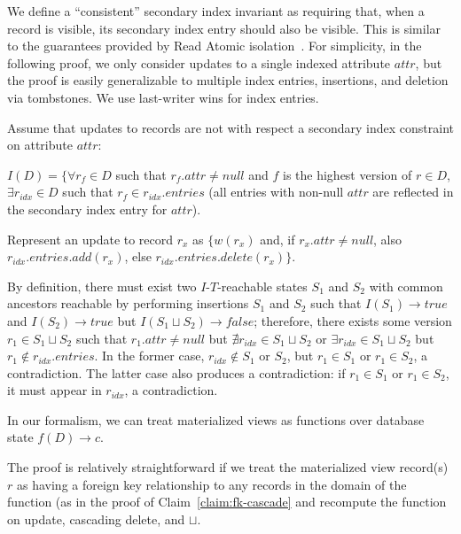 We define a ``consistent'' secondary index invariant as requiring that, when a record is visible, its secondary index entry should also be visible. This is similar to the guarantees provided by Read Atomic isolation~\cite{ramp-sigmod14}. For simplicity, in the following proof, we only consider updates to a single indexed attribute $attr$, but the proof is easily generalizable to multiple index entries, insertions, and deletion via tombstones. We use last-writer wins for index entries.

\begin{claim} \label{claim:indexing}
  Assume that updates to records are not \iconfluent with respect a secondary index constraint on attribute $attr$:

\noindent $I(D) = \{\forall r_f \in D$ such that $r_f.attr \neq null$ and $f$ is the highest version of $r\in D$, $\exists r_{idx} \in D$ such that $r_f \in r_{idx}.entries$ (all entries with non-null $attr$ are reflected in the secondary index entry for $attr$).

  Represent an update to record $r_x$ as $\{w(r_x)$ and, if $r_x.attr \neq null$, also $r_{idx}.entries.add(r_x)$, else $r_{idx}.entries.delete(r_x)\}$.

  By definition, there must exist two $I$-$T$-reachable states $S_1$ and $S_2$ with common ancestors reachable by performing insertions $S_1$ and $S_2$ such that $I(S_1) \rightarrow true$ and $I(S_2) \rightarrow true$ but $I(S_1 \sqcup S_2) \rightarrow false$; therefore, there exists some version $r_1 \in S_1 \sqcup S_2$ such that $r_1.attr \neq null$ but $\nexists r_{idx} \in S_1 \sqcup S_2$ or $\exists r_{idx} \in S_1 \sqcup S_2$ but $r_1 \notin r_{idx}.entries$. In the former case, $r_{idx} \notin S_1$ or $S_2$, but $r_1 \in S_1$ or $r_1 \in S_2$, a contradiction. The latter case also produces a contradiction: if $r_1 \in S_1$ or $r_1 \in S_2$, it must appear in $r_{idx}$, a contradiction.  \end{claim}

In our formalism, we can treat materialized views as functions over database state $f(D) \rightarrow c$.

\begin{claim} The proof is relatively straightforward if we treat the materialized view record(s) $r$ as having a foreign key relationship to any records in the domain of the function (as in the proof of Claim~\ref{claim:fk-cascade} and recompute the function on update, cascading delete, and $\sqcup$.\end{claim}

